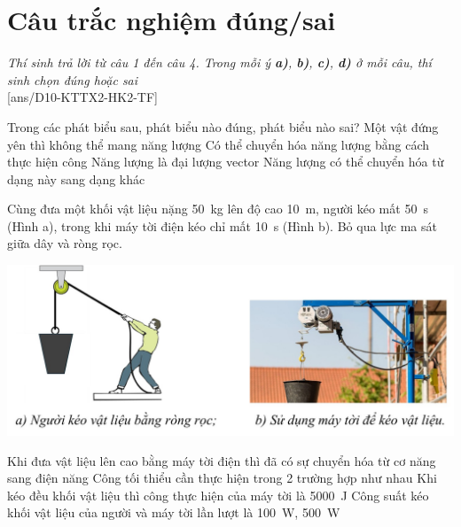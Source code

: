 \section{Câu trắc nghiệm đúng/sai} 
\textit{Thí sinh trả lời từ câu 1 đến câu 4. Trong mỗi ý \textbf{a)}, \textbf{b)}, \textbf{c)}, \textbf{d)} ở mỗi câu, thí sinh chọn đúng hoặc sai}
\setcounter{ex}{0}\\
[ans/D10-KTTX2-HK2-TF]
\begin{ex}
	Trong các phát biểu sau, phát biểu nào đúng, phát biểu nào sai?
	\choiceTF
	{Một vật đứng yên thì không thể mang năng lượng}
	{\True Có thể chuyển hóa năng lượng bằng cách thực hiện công}
	{Năng lượng là đại lượng vector}
	{\True Năng lượng có thể chuyển hóa từ dạng này sang dạng khác}
	\loigiai{}
\end{ex}
\begin{ex}
	Cùng đưa một khối vật liệu nặng \SI{50}{\kilogram} lên độ cao \SI{10}{\meter}, người kéo mất \SI{50}{\second} (Hình a), trong khi máy tời điện kéo chỉ mất \SI{10}{\second} (Hình b). Bỏ qua lực ma sát giữa dây và ròng rọc.
	\begin{center}
		\includegraphics[scale=0.45]{../figs/D10-KTTX2-HK2-1}
	\end{center}
	\choiceTF
	{Khi đưa vật liệu lên cao bằng máy tời điện thì đã có sự chuyển hóa từ cơ năng sang điện năng}
	{\True Công tối thiểu cần thực hiện trong 2 trường hợp như nhau}
	{\True Khi kéo đều khối vật liệu thì công thực hiện của máy tời là \SI{5000}{\joule}}
	{\True Công suất kéo khối vật liệu của người và máy tời lần lượt là \SI{100}{\watt}, \SI{500}{\watt}}
	\loigiai{}
\end{ex}
